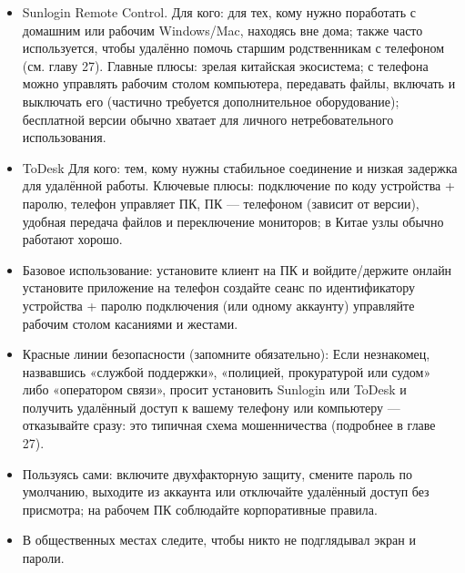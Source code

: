 \begin{itemize}
  \item Sunlogin Remote Control. Для кого: для тех, кому нужно поработать с домашним или рабочим Windows/Mac, находясь вне дома; также часто используется, чтобы удалённо помочь старшим родственникам с телефоном (см. главу 27). Главные плюсы: зрелая китайская экосистема; с телефона можно управлять рабочим столом компьютера, передавать файлы, включать и выключать его (частично требуется дополнительное оборудование); бесплатной версии обычно хватает для личного нетребовательного использования.
  \item ToDesk Для кого: тем, кому нужны стабильное соединение и низкая задержка для удалённой работы. Ключевые плюсы: подключение по коду устройства + паролю, телефон управляет ПК, ПК — телефоном (зависит от версии), удобная передача файлов и переключение мониторов; в Китае узлы обычно работают хорошо.
  \item Базовое использование: установите клиент на ПК и войдите/держите онлайн установите приложение на телефон создайте сеанс по идентификатору устройства + паролю подключения (или одному аккаунту) управляйте рабочим столом касаниями и жестами.
  \item Красные линии безопасности (запомните обязательно): Если незнакомец, назвавшись «службой поддержки», «полицией, прокуратурой или судом» либо «оператором связи», просит установить Sunlogin или ToDesk и получить удалённый доступ к вашему телефону или компьютеру — отказывайте сразу: это типичная схема мошенничества (подробнее в главе 27).
  \item Пользуясь сами: включите двухфакторную защиту, смените пароль по умолчанию, выходите из аккаунта или отключайте удалённый доступ без присмотра; на рабочем ПК соблюдайте корпоративные правила.
  \item В общественных местах следите, чтобы никто не подглядывал экран и пароли.
\end{itemize}


